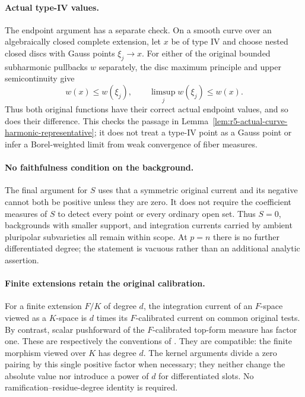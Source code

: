 \documentclass[11pt,a4paper]{article}
\numberwithin{equation}{section}
\theoremstyle{definition}
\theoremstyle{remark}
\begin{document}
\paragraph{Actual type-IV values.}
The endpoint argument has a separate check.  On a smooth curve
over an algebraically closed complete extension, let $x$ be of
type IV and choose nested closed discs with Gauss points
$\xi_j\to x$.  For either of the original bounded subharmonic
pullbacks $w$ separately, the disc maximum principle and upper
semicontinuity give
\[
       w(x)\leq w(\xi_j),\qquad
       \limsup_j w(\xi_j)\leq w(x).
\]
Thus both original functions have their correct actual endpoint
values, and so does their difference.  This checks the passage
in Lemma~\ref{lem:r5-actual-curve-harmonic-representative}; it
does not treat a type-IV point as a Gauss point or infer a
Borel-weighted limit from weak convergence of fiber measures.

\paragraph{No faithfulness condition on the background.}
The final argument for $S$ uses that a symmetric original current
and its negative cannot both be positive unless they are zero.
It does not require the coefficient measures of $S$ to detect
every point or every ordinary open set.  Thus $S=0$, backgrounds
with smaller support, and integration currents carried by
ambient pluripolar subvarieties all remain within scope.
At $p=n$ there is no further differentiated degree; the statement
is vacuous rather than an additional analytic assertion.

\paragraph{Finite extensions retain the original calibration.}
For a finite extension $F/K$ of degree $d$, the integration
current of an $F$-space viewed as a $K$-space is $d$ times its
$F$-calibrated current on common original tests.  By contrast,
scalar pushforward of the $F$-calibrated top-form measure has
factor one.  These are respectively the conventions of
\cite[Remark 14.4.3, p.~410, and Proposition 15.3.1, p.~425]{CLD25}.
They are compatible: the finite morphism viewed over $K$ has
degree $d$.  The kernel arguments divide a zero pairing by this
single positive factor when necessary; they neither change the
absolute value nor introduce a power of $d$ for differentiated
slots.  No ramification--residue-degree identity is required.
\end{document}
